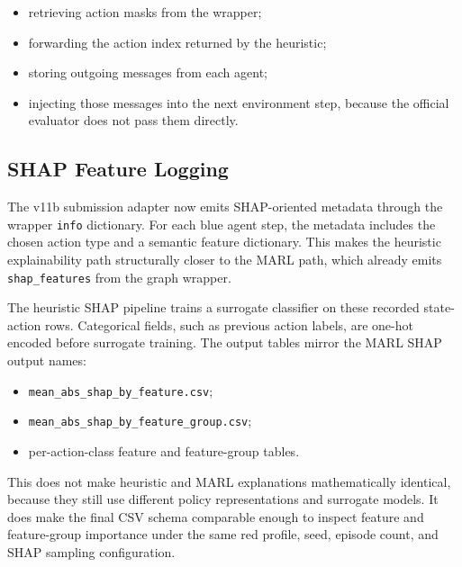 \begin{itemize}
  \item retrieving action masks from the wrapper;
  \item forwarding the action index returned by the heuristic;
  \item storing outgoing messages from each agent;
  \item injecting those messages into the next environment step, because the official evaluator does not pass them directly.
\end{itemize}

\subsection{SHAP Feature Logging}

The v11b submission adapter now emits SHAP-oriented metadata through the wrapper \texttt{info} dictionary. For each blue agent step, the metadata includes the chosen action type and a semantic feature dictionary. This makes the heuristic explainability path structurally closer to the MARL path, which already emits \texttt{shap\_features} from the graph wrapper.

The heuristic SHAP pipeline trains a surrogate classifier on these recorded state-action rows. Categorical fields, such as previous action labels, are one-hot encoded before surrogate training. The output tables mirror the MARL SHAP output names:

\begin{itemize}
  \item \texttt{mean\_abs\_shap\_by\_feature.csv};
  \item \texttt{mean\_abs\_shap\_by\_feature\_group.csv};
  \item per-action-class feature and feature-group tables.
\end{itemize}

This does not make heuristic and MARL explanations mathematically identical, because they still use different policy representations and surrogate models. It does make the final CSV schema comparable enough to inspect feature and feature-group importance under the same red profile, seed, episode count, and SHAP sampling configuration.
